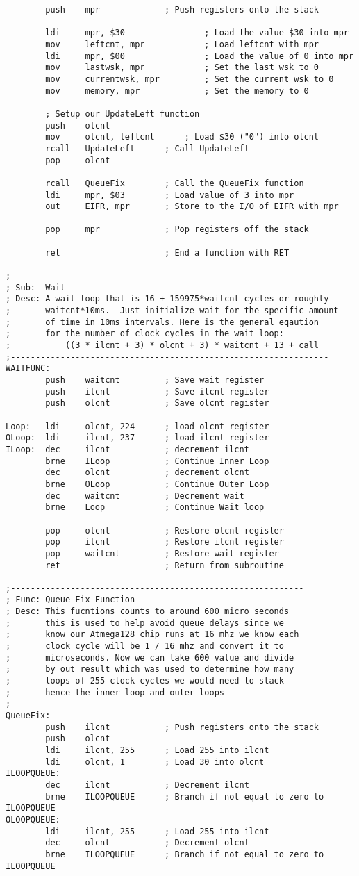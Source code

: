 \documentclass[12pt, letterpaper]{article}
\begin{document}
\begin{verbatim}
		push	mpr				; Push registers onto the stack

		ldi		mpr, $30				; Load the value $30 into mpr
		mov		leftcnt, mpr			; Load leftcnt with mpr
		ldi		mpr, $00				; Load the value of 0 into mpr
		mov		lastwsk, mpr			; Set the last wsk to 0
		mov		currentwsk, mpr			; Set the current wsk to 0
		mov		memory, mpr				; Set the memory to 0

		; Setup our UpdateLeft function
		push	olcnt
		mov		olcnt, leftcnt		; Load $30 ("0") into olcnt
		rcall	UpdateLeft		; Call UpdateLeft
		pop		olcnt

		rcall	QueueFix		; Call the QueueFix function
		ldi		mpr, $03		; Load value of 3 into mpr
		out		EIFR, mpr		; Store to the I/O of EIFR with mpr

		pop		mpr				; Pop registers off the stack

		ret						; End a function with RET	

;----------------------------------------------------------------
; Sub:	Wait
; Desc:	A wait loop that is 16 + 159975*waitcnt cycles or roughly 
;		waitcnt*10ms.  Just initialize wait for the specific amount 
;		of time in 10ms intervals. Here is the general eqaution
;		for the number of clock cycles in the wait loop:
;			((3 * ilcnt + 3) * olcnt + 3) * waitcnt + 13 + call
;----------------------------------------------------------------
WAITFUNC:
		push	waitcnt			; Save wait register
		push	ilcnt			; Save ilcnt register
		push	olcnt			; Save olcnt register

Loop:	ldi		olcnt, 224		; load olcnt register
OLoop:	ldi		ilcnt, 237		; load ilcnt register
ILoop:	dec		ilcnt			; decrement ilcnt
		brne	ILoop			; Continue Inner Loop
		dec		olcnt			; decrement olcnt
		brne	OLoop			; Continue Outer Loop
		dec		waitcnt			; Decrement wait 
		brne	Loop			; Continue Wait loop	

		pop		olcnt			; Restore olcnt register
		pop		ilcnt			; Restore ilcnt register
		pop		waitcnt			; Restore wait register
		ret						; Return from subroutine

;-----------------------------------------------------------
; Func: Queue Fix Function
; Desc: This fucntions counts to around 600 micro seconds
;		this is used to help avoid queue delays since we
;		know our Atmega128 chip runs at 16 mhz we know each
;		clock cycle will be 1 / 16 mhz and convert it to
;		microseconds. Now we can take 600 value and divide
;		by out result which was used to determine how many
;		loops of 255 clock cycles we would need to stack
;		hence the inner loop and outer loops
;-----------------------------------------------------------
QueueFix:
		push	ilcnt			; Push registers onto the stack
		push	olcnt
		ldi		ilcnt, 255		; Load 255 into ilcnt
		ldi		olcnt, 1		; Load 30 into olcnt
ILOOPQUEUE:
		dec		ilcnt			; Decrement ilcnt
		brne	ILOOPQUEUE		; Branch if not equal to zero to ILOOPQUEUE
OLOOPQUEUE:
		ldi		ilcnt, 255		; Load 255 into ilcnt
		dec		olcnt			; Decrement olcnt
		brne	ILOOPQUEUE		; Branch if not equal to zero to ILOOPQUEUE


\end{verbatim}
\end{document}
